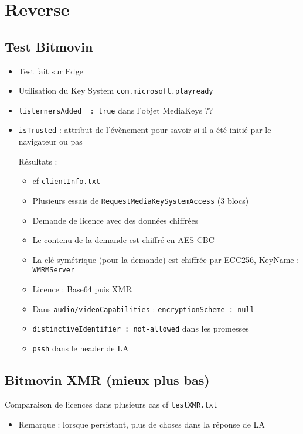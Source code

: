 \documentclass[french]{article}
\begin{document}
\section{Reverse}

\subsection{Test Bitmovin}
\begin{itemize}
	\item Test fait sur Edge
	\item Utilisation du Key System \texttt{com.microsoft.playready}
	\item \texttt{listernersAdded\_ : true} dans l'objet MediaKeys ??
	\item \texttt{isTrusted} : attribut de l'évènement pour savoir si il a été initié par le navigateur ou pas

Résultats :
\begin{itemize}
	\item cf \texttt{clientInfo.txt}
	\item Plusieurs essais de \texttt{RequestMediaKeySystemAccess} (3 blocs)
	\item Demande de licence avec des données chiffrées
	\item Le contenu de la demande est chiffré en AES CBC
	\item La clé symétrique (pour la demande) est chiffrée par ECC256, KeyName : \texttt{WMRMServer}
	\item Licence : Base64 puis XMR
	\item Dans \texttt{audio/videoCapabilities} : \texttt{encryptionScheme : null}
	\item \texttt{distinctiveIdentifier : not-allowed} dans les promesses
	\item \texttt{pssh} dans le header de LA
\end{itemize}
\end{itemize}

\subsection{Bitmovin XMR (mieux plus bas)}
Comparaison de licences dans plusieurs cas cf \texttt{testXMR.txt}
\begin{itemize}
	\item Remarque : lorsque persistant, plus de choses dans la réponse de LA
\end{itemize}
\end{document}
